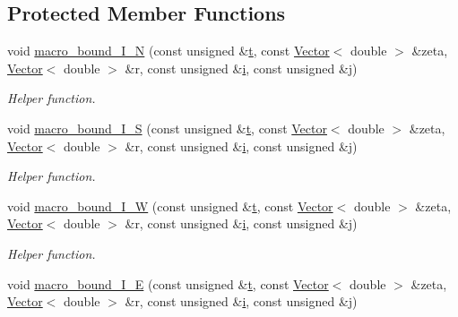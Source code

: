 \subsection*{Protected Member Functions}
\begin{DoxyCompactItemize}
\item 
void \hyperlink{classoomph_1_1ChannelWithLeafletDomain_a08d97680e95f42a385a869d5c384e610}{macro\+\_\+bound\+\_\+\+I\+\_\+N} (const unsigned \&\hyperlink{cfortran_8h_af6f0bd3dc13317f895c91323c25c2b8f}{t}, const \hyperlink{classoomph_1_1Vector}{Vector}$<$ double $>$ \&zeta, \hyperlink{classoomph_1_1Vector}{Vector}$<$ double $>$ \&r, const unsigned \&\hyperlink{cfortran_8h_adb50e893b86b3e55e751a42eab3cba82}{i}, const unsigned \&j)
\begin{DoxyCompactList}\small\item\em Helper function. \end{DoxyCompactList}\item 
void \hyperlink{classoomph_1_1ChannelWithLeafletDomain_a20898c8b6747cf01e3e92e4a5c6ff5e4}{macro\+\_\+bound\+\_\+\+I\+\_\+S} (const unsigned \&\hyperlink{cfortran_8h_af6f0bd3dc13317f895c91323c25c2b8f}{t}, const \hyperlink{classoomph_1_1Vector}{Vector}$<$ double $>$ \&zeta, \hyperlink{classoomph_1_1Vector}{Vector}$<$ double $>$ \&r, const unsigned \&\hyperlink{cfortran_8h_adb50e893b86b3e55e751a42eab3cba82}{i}, const unsigned \&j)
\begin{DoxyCompactList}\small\item\em Helper function. \end{DoxyCompactList}\item 
void \hyperlink{classoomph_1_1ChannelWithLeafletDomain_a15e43fe342a04c8466a43112e3a48ff3}{macro\+\_\+bound\+\_\+\+I\+\_\+W} (const unsigned \&\hyperlink{cfortran_8h_af6f0bd3dc13317f895c91323c25c2b8f}{t}, const \hyperlink{classoomph_1_1Vector}{Vector}$<$ double $>$ \&zeta, \hyperlink{classoomph_1_1Vector}{Vector}$<$ double $>$ \&r, const unsigned \&\hyperlink{cfortran_8h_adb50e893b86b3e55e751a42eab3cba82}{i}, const unsigned \&j)
\begin{DoxyCompactList}\small\item\em Helper function. \end{DoxyCompactList}\item 
void \hyperlink{classoomph_1_1ChannelWithLeafletDomain_ac0bc6edb7d09bfdb310de99f846f5093}{macro\+\_\+bound\+\_\+\+I\+\_\+E} (const unsigned \&\hyperlink{cfortran_8h_af6f0bd3dc13317f895c91323c25c2b8f}{t}, const \hyperlink{classoomph_1_1Vector}{Vector}$<$ double $>$ \&zeta, \hyperlink{classoomph_1_1Vector}{Vector}$<$ double $>$ \&r, const unsigned \&\hyperlink{cfortran_8h_adb50e893b86b3e55e751a42eab3cba82}{i}, const unsigned \&j)

\end{DoxyCompactItemize}
